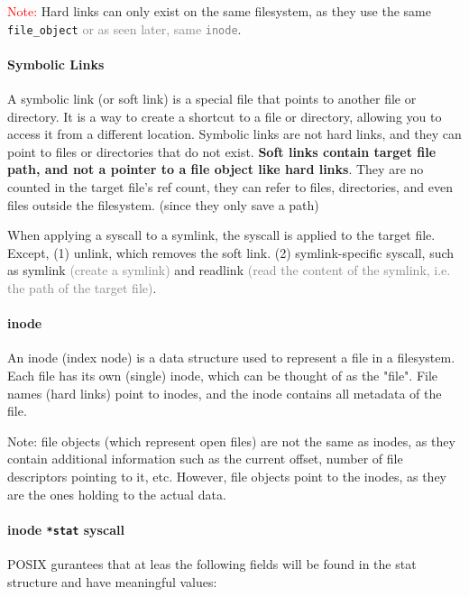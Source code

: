 \documentclass[openany,12pt]{book}
\newcommand{\code}[1]{\texttt{#1}}
\newcommand{\red}[1]{\textcolor{Red}{#1}}
\newcommand{\gray}[1]{\textcolor{gray}{#1}}
\begin{document}
\red{Note:} Hard links can only exist on the same filesystem, as they use the same \code{file\_object} \gray{or as seen later, same \code{inode}}.

\paragraph{Symbolic Links} A symbolic link (or soft link) is a special file that points to another file or directory. It is a way to create a shortcut to a file or directory, allowing you to access it from a different location. Symbolic links are not hard links, and they can point to files or directories that do not exist. \textbf{Soft links contain target file path, and not a pointer to a file object like hard links}. They are no counted in the target file's ref count, they can refer to files, directories, and even files outside the filesystem. (since they only save a path)


When applying a syscall to a symlink, the syscall is applied to the target file. Except, (1) unlink, which removes the soft link. (2) symlink-specific syscall, such as symlink \gray{(create a symlink)} and readlink \gray{(read the content of the symlink, i.e. the path of the target file)}.



\paragraph{inode} An inode (index node) is a data structure used to represent a file in a filesystem. Each file has its own (single) inode, which can be thought of as the "file". File names (hard links) point to inodes, and the inode contains all metadata of the file.

Note: file objects (which represent open files) are not the same as inodes, as they contain additional information such as the current offset, number of file descriptors pointing to it, etc. However, file objects point to the inodes, as they are the ones holding to the actual data.

\paragraph{inode \code{*stat} syscall} POSIX gurantees that at leas the following fields will be found in the stat structure and have meaningful values:
\end{document}
